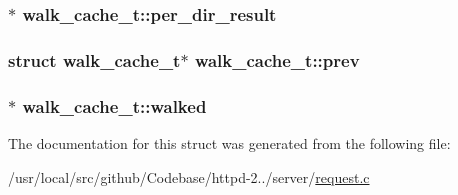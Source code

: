 \subsubsection[{\texorpdfstring{per\+\_\+dir\+\_\+result}{per_dir_result}}]{$\ast$ walk\+\_\+cache\+\_\+t\+::per\+\_\+dir\+\_\+result}\hypertarget{structwalk__cache__t_a9ef6aa0ee43e451121debf55a70bf37b}{}\label{structwalk__cache__t_a9ef6aa0ee43e451121debf55a70bf37b}
\subsubsection[{\texorpdfstring{prev}{prev}}]{\setlength{\rightskip}{0pt plus 5cm}struct {\bf walk\+\_\+cache\+\_\+t}$\ast$ walk\+\_\+cache\+\_\+t\+::prev}\hypertarget{structwalk__cache__t_a8c7c317890be19f71214d791894d574a}{}\label{structwalk__cache__t_a8c7c317890be19f71214d791894d574a}
\subsubsection[{\texorpdfstring{walked}{walked}}]{$\ast$ walk\+\_\+cache\+\_\+t\+::walked}\hypertarget{structwalk__cache__t_a8c82bac2e2820f9f2b2f20199554d371}{}\label{structwalk__cache__t_a8c82bac2e2820f9f2b2f20199554d371}


The documentation for this struct was generated from the following file\+:\begin{DoxyCompactItemize}
\item 
/usr/local/src/github/\+Codebase/httpd-\/2../server/\hyperlink{request_8c}{request.\+c}\end{DoxyCompactItemize}
